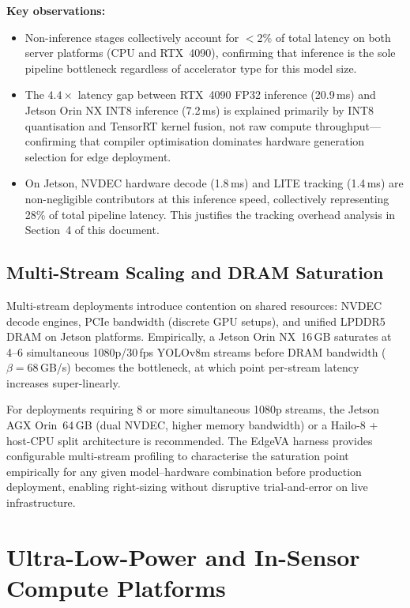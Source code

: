 \documentclass[11pt,a4paper]{article}
\begin{document}
\medskip
\noindent\textbf{Key observations:}

\begin{itemize}[leftmargin=*, noitemsep]
  \item Non-inference stages collectively account for $<$2\% of total
    latency on both server platforms (CPU and RTX~4090), confirming that
    inference is the sole pipeline bottleneck regardless of accelerator
    type for this model size.
  \item The $4.4{\times}$ latency gap between RTX~4090 FP32 inference
    (20.9\,ms) and Jetson Orin NX INT8 inference (7.2\,ms) is explained
    primarily by INT8 quantisation and TensorRT kernel fusion, not
    raw compute throughput---confirming that compiler optimisation
    dominates hardware generation selection for edge deployment.
  \item On Jetson, NVDEC hardware decode (1.8\,ms) and LITE tracking
    (1.4\,ms) are non-negligible contributors at this inference speed,
    collectively representing 28\% of total pipeline latency. This
    justifies the tracking overhead analysis in Section~4 of this
    document.
\end{itemize}

\subsection{Multi-Stream Scaling and DRAM Saturation}
\label{subsec:reproducibility}
Multi-stream deployments introduce contention on shared resources:
NVDEC decode engines, PCIe bandwidth (discrete GPU setups), and
unified LPDDR5 DRAM on Jetson platforms. Empirically, a
Jetson Orin NX~16\,GB saturates at 4--6 simultaneous
1080p/30\,fps YOLOv8m streams before DRAM bandwidth
($\beta = 68$\,GB/s) becomes the bottleneck, at which point
per-stream latency increases super-linearly.

For deployments requiring 8 or more simultaneous 1080p streams,
the Jetson AGX Orin~64\,GB (dual NVDEC, higher memory bandwidth)
or a Hailo-8 + host-CPU split architecture is recommended. The
EdgeVA harness provides configurable multi-stream profiling to
characterise the saturation point empirically for any given
model--hardware combination before production deployment,
enabling right-sizing without disruptive trial-and-error on
live infrastructure.

\section{Ultra-Low-Power and In-Sensor Compute Platforms}
\label{sec:insensor}
\end{document}

